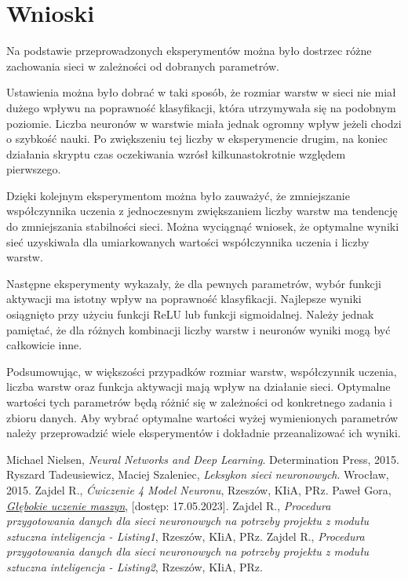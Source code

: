 \documentclass{article}
\begin{document}
\newpage
\section{Wnioski}
Na podstawie przeprowadzonych eksperymentów można było dostrzec różne zachowania sieci w zależności od dobranych parametrów.

Ustawienia można było dobrać w taki sposób, że rozmiar warstw w sieci nie miał dużego wpływu na poprawność klasyfikacji, która utrzymywała się na podobnym poziomie.
Liczba neuronów w warstwie miała jednak ogromny wpływ jeżeli chodzi o szybkość nauki. Po zwiększeniu tej liczby w eksperymencie drugim, na koniec działania skryptu czas oczekiwania wzrósł kilkunastokrotnie względem pierwszego.

Dzięki kolejnym eksperymentom można było zauważyć, że zmniejszanie współczynnika uczenia z jednoczesnym zwiększaniem liczby warstw ma tendencję do zmniejszania stabilności sieci.
Można wyciągnąć wniosek, że optymalne wyniki sieć uzyskiwała dla umiarkowanych wartości współczynnika uczenia i liczby warstw.

Następne eksperymenty wykazały, że dla pewnych parametrów, wybór funkcji aktywacji ma istotny wpływ na poprawność klasyfikacji.
Najlepsze wyniki osiągnięto przy użyciu funkcji ReLU lub funkcji sigmoidalnej.
Należy jednak pamiętać, że dla różnych kombinacji liczby warstw i neuronów wyniki mogą być całkowicie inne.

Podsumowując, w większości przypadków rozmiar warstw, współczynnik uczenia, liczba warstw oraz funkcja aktywacji mają wpływ na działanie sieci.
Optymalne wartości tych parametrów będą różnić się w zależności od konkretnego zadania i zbioru danych.
Aby wybrać optymalne wartości wyżej wymienionych parametrów należy przeprowadzić wiele eksperymentów i dokładnie przeanalizować ich wyniki.

\newpage
\begin{thebibliography}{9}
    Michael Nielsen,
    \emph{Neural Networks and Deep Learning}.
    Determination Press,
    2015.
    Ryszard Tadeusiewicz, Maciej Szaleniec,
    \emph{Leksykon sieci neuronowych}.
    Wrocław,
    2015.
    Zajdel R.,
    \emph{Ćwiczenie 4 Model Neuronu},
    Rzeszów,
    KIiA, PRz.
    Paweł Gora,
    \href{https://www.deltami.edu.pl/temat/informatyka/sztuczna_inteligencja/2017/12/28/Glebokie_uczenie_maszyn/}{\emph{Głębokie uczenie maszyn}},
    [dostęp: 17.05.2023].
    Zajdel R.,
    \emph{Procedura przygotowania danych dla sieci neuronowych na potrzeby projektu z modułu sztuczna inteligencja - Listing1},
    Rzeszów,
    KIiA, PRz.
    Zajdel R.,
    \emph{Procedura przygotowania danych dla sieci neuronowych na potrzeby projektu z modułu sztuczna inteligencja - Listing2},
    Rzeszów,
    KIiA, PRz.
\end{thebibliography}
\end{document}
